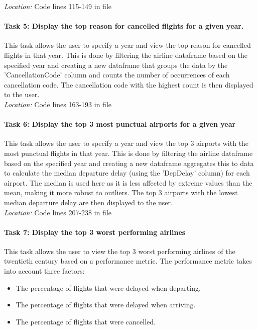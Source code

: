 \noindent \textit{Location:} Code lines 115-149 in file 

\paragraph{Task 5: Display the top reason for cancelled flights for a given year.} This task allows the user to specify a year and view the top reason for cancelled flights in that year. This is done by filtering the airline dataframe based on the specified year and creating a new dataframe that groups the data by the 'CancellationCode' column and counts the number of occurrences of each cancellation code. The cancellation code with the highest count is then displayed to the user.\\

\noindent \textit{Location:} Code lines 163-193 in file 

\paragraph{Task 6: Display the top 3 most punctual airports for a given year} This task allows the user to specify a year and view the top 3 airports with the most punctual flights in that year. This is done by filtering the airline dataframe based on the specified year and creating a new dataframe aggregates this to data to calculate the median departure delay (using the 'DepDelay' column) for each airport. The median is used here as it is less affected by extreme values than the mean, making it more robust to outliers. The top 3 airports with the lowest median departure delay are then displayed to the user.\\

\noindent \textit{Location:} Code lines 207-238 in file 

\paragraph{Task 7: Display the top 3 worst performing airlines} This task allows the user to view the top 3 worst performing airlines of the twentieth century based on a performance metric. The performance metric takes into account three factors:

\begin{itemize}
    \item The percentage of flights that were delayed when departing.
    \item The percentage of flights that were delayed when arriving.
    \item The percentage of flights that were cancelled.
\end{itemize}

